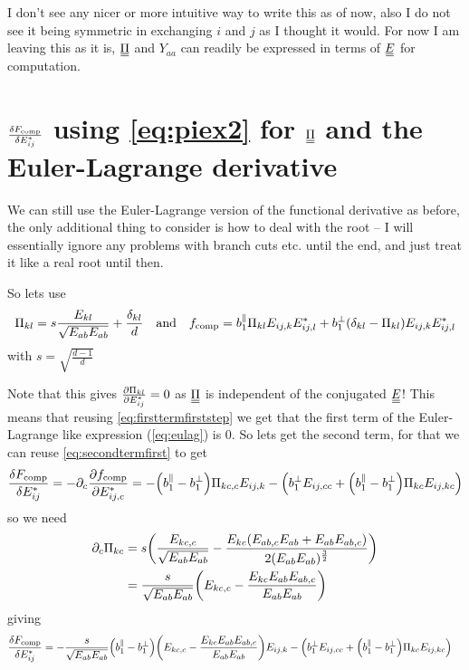 \documentclass{article}
\newcommand\barbelow[1]{\stackunder[1.2pt]{$#1$}{\rule{1.5ex}{.1ex}}}
\newcommand{\du}[1]{\barbelow{\barbelow{#1}}}
\newcommand{\pp}{\partial}
\begin{document}
I don't see any nicer or more intuitive way to write this as of now, also I do not see it being symmetric in exchanging $i$ and $j$ as I thought it would.
For now I am leaving this as it is, $\du{\Pi}$ and $Y_{aa}$ can readily be expressed in terms of $\du{E}$ for computation.

\pagebreak
\section{$\fdv{F_\text{comp}}{E_{ij}^*}$ using \cref{eq:piex2} for $\du{\Pi}$ and the Euler-Lagrange derivative}
We can still use the Euler-Lagrange version of the functional derivative as before, the only additional thing to consider is how to deal with the root -- I will essentially ignore any problems with branch cuts etc. until the end, and just treat it like a real root until then.

So lets use 
\begin{equation}
    \Pi_{kl} = s \frac{E_{kl} }{\sqrt{E_{ab}E_{ab}}} + \frac{\delta_{kl}}{d} \qq{and} f_\text{comp} = b_1^\parallel \Pi_{kl} E_{ij,k}E_{ij,l}^* + b_1^\perp (\delta_{kl} - \Pi_{kl}) E_{ij,k}E_{ij,l}^*
\end{equation}
with $s = \sqrt{\frac{d-1}{d}}$

Note that this gives $\pdv{\Pi_{kl}}{E_{ij}^*} = 0$ as $\du{\Pi}$ is independent of the conjugated $\du{E}$! This means that reusing \cref{eq:firsttermfirststep} we get that the first term of the Euler-Lagrange like expression (\cref{eq:eulag}) is 0.
So lets get the second term, for that we can reuse \cref{eq:secondtermfirst} to get
\begin{equation}
    \fdv{F_\text{comp}}{E_{ij}^*} = -\pp_c \pdv{f_\text{comp}}{E_{ij,c}^*} = -\qty(b_1^\parallel - b_1^\perp) \Pi_{kc,c} E_{ij,k} - \qty(b_1^\perp E_{ij,cc} + \qty(b_1^\parallel - b_1^\perp) \Pi_{kc} E_{ij,kc})
\end{equation}
so we need
\begin{align}
    \pp_c \Pi_{kc} &= s\qty(\frac{E_{kc,c}}{\sqrt{E_{ab}E_{ab}}} - \frac{E_{kc}(E_{ab,c}E_{ab} + E_{ab}E_{ab,c})}{2(E_{ab}E_{ab})^\frac{3}{2}}) \\
    &= \frac{s}{\sqrt{E_{ab}E_{ab}}} \qty(E_{kc,c} - \frac{E_{kc}E_{ab}E_{ab,c}}{E_{ab}E_{ab}}) \\
\end{align}
giving
\begin{align}
    \fdv{F_\text{comp}}{E_{ij}^*} &= -\frac{s}{\sqrt{E_{ab}E_{ab}}}\qty(b_1^\parallel - b_1^\perp) \qty(E_{kc,c} - \frac{E_{kc}E_{ab}E_{ab,c}}{E_{ab}E_{ab}}) E_{ij,k} - \qty(b_1^\perp E_{ij,cc} + \qty(b_1^\parallel - b_1^\perp) \Pi_{kc} E_{ij,kc})
\end{align}
\end{document}
